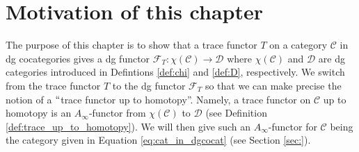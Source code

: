\section{Motivation of this chapter}
The purpose of this chapter is to 
show that a trace functor $T$ on a 
category $\mathcal{C}$ in dg cocategories 
gives a dg functor $\mathcal{F}_T: 
\chi(\mathcal{C}) \to \mathcal{D}$ where 
$\chi(\mathcal{C})$ and 
$\mathcal{D}$ are dg categories 
introduced in Defintions \ref{def:chi} and 
\ref{def:D}, respectively. We switch from 
the trace functor $T$ to the dg functor 
$\mathcal{F}_T$ so that we can make 
precise the notion of a $``$trace 
functor up to homotopy''. Namely, a 
trace functor on $\mathcal{C}$ up to homotopy 
is an $A_\infty$-functor from 
$\chi(\mathcal{C})$ to $\mathcal{D}$ 
(see Definition \ref{def:trace_up_to_homotopy}). 
We will then give such an $A_\infty$-functor 
for $\mathcal{C}$ being the category 
given in Equation \ref{eq:cat_in_dgcocat} 
(see Section \ref{sec:}).
